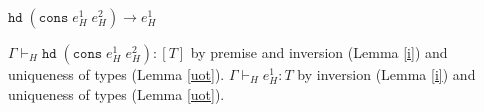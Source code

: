 \begin{case}
$\mathtt{hd}\;(\mathtt{cons}\;e_{H}^{1}\;e_{H}^{2})\rightarrow e_{H}^{1}$

$\Gamma\vdash_{H}\mathtt{hd}\;(\mathtt{cons}\;e_{H}^{1}\;e_{H}^{2}):[T]$ by premise and inversion (Lemma \ref{i}) and uniqueness of types (Lemma \ref{uot}).  $\Gamma\vdash_{H}e_{H}^{1}:T$ by inversion (Lemma \ref{i}) and uniqueness of types (Lemma \ref{uot}).
\end{case}